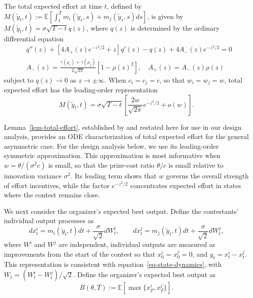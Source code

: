 \documentclass[mnsc]{informs3}
\begin{document}
\begin{lemma}\label{lem-total-effort}
The total expected effort at time $t$, defined by $M(\tilde{y}_t, t) := \mathbb{E}\left[\int^T_t m_i(\tilde{y}_s, s) + m_j(\tilde{y}_s, s)ds\right]$, is given by $M(\tilde{y}_t, t) = \sigma \sqrt{T-t} q(z)$, where $q(z)$ is determined by the ordinary differential equation
\begin{equation}
\begin{aligned}
&q''(z) + \left[4A_+(z)e^{-z^2/2}+z\right]q'(z) - q(z) + 4A_-(z)e^{-z^2/2} = 0\\
&A_-(z) = \frac{\gamma(\rho_i) + \gamma(\rho_j)}{2\sqrt{2\pi}}[1 - \rho(z)^2],
\quad A_+(z) = A_-(z)\rho(z)
\end{aligned}
\end{equation}
subject to $q(z)\to0$ as $z\to\pm\infty$.
When $c_i=c_j=c$, so that $w_i=w_j=w$, total expected effort has the leading-order representation
\begin{equation}\label{eq-totaleffort-reduced}
M(\tilde{y}_t, t)
=\sigma\sqrt{T-t}\left[
\frac{2w}{\sqrt{2\pi}}e^{-z^2/2}+o(w)
\right].
\end{equation}
\end{lemma}

Lemma~\ref{lem-total-effort}, established by \citet{Ryvkin2022Fight} and restated here for use in our design analysis, provides an ODE characterization of total expected effort for the general asymmetric case.
For the design analysis below, we use its leading-order symmetric approximation.
This approximation is most informative when $w=\theta/(\sigma^2c)$ is small, so that the prize-cost ratio $\theta/c$ is small relative to innovation variance $\sigma^2$.
Its leading term shows that $w$ governs the overall strength of effort incentives, while the factor $e^{-z^2/2}$ concentrates expected effort in states where the contest remains close.

We next consider the organizer's expected best output.
Define the contestants' individual output processes as
\begin{equation}\label{eq-individual-output-levels}
dx_t^i=m_i(\tilde y_t,t)dt+\frac{\sigma}{\sqrt{2}}dW_t^i,
\qquad
dx_t^j=m_j(\tilde y_t,t)dt+\frac{\sigma}{\sqrt{2}}dW_t^j,
\end{equation}
where $W^i$ and $W^j$ are independent, individual outputs are measured as improvements from the start of the contest so that $x_0^i=x_0^j=0$, and $y_t=x_t^i-x_t^j$.
This representation is consistent with equation~\eqref{eq-state-dynamics}, with $W_t=(W_t^i-W_t^j)/\sqrt{2}$.
Define the organizer's expected best output as
\begin{equation}\label{eq-expected-best-output}
B(\theta,T):=\mathbb E\left[\max\{x_T^i,x_T^j\}\right].
\end{equation}
\end{document}
